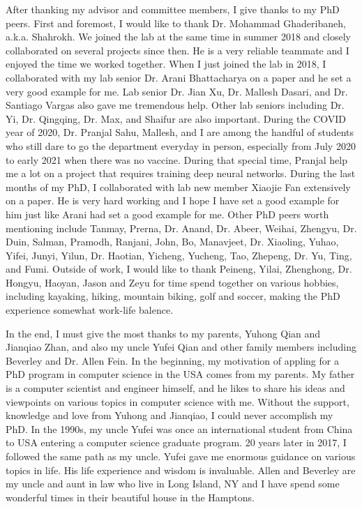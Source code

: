After thanking my advisor and committee members, I give thanks to my PhD peers. First and foremost, I would like to thank Dr. Mohammad Ghaderibaneh, a.k.a. Shahrokh.
We joined the lab at the same time in summer 2018 and closely collaborated on several projects since then. 
He is a very reliable teammate and I enjoyed the time we worked together.
When I just joined the lab in 2018, I collaborated with my lab senior Dr. Arani Bhattacharya on a paper and he set a very good example for me. 
Lab senior Dr. Jian Xu, Dr. Mallesh Dasari, and Dr. Santiago Vargas also gave me tremendous help. Other lab seniors including Dr. Yi, Dr. Qingqing, Dr. Max, and Shaifur are also important.
During the COVID year of 2020, Dr. Pranjal Sahu, Mallesh, and I are among the handful of students who still dare to go the department everyday in person, 
especially from July 2020 to early 2021 when there was no vaccine.
During that special time, Pranjal help me a lot on a project that requires training deep neural networks.
During the last months of my PhD, I collaborated with lab new member Xiaojie Fan extensively on a paper.
He is very hard working and I hope I have set a good example for him just like Arani had set a good example for me.
Other PhD peers worth mentioning include Tanmay, Prerna, Dr. Anand, Dr. Abeer, Weihai, Zhengyu, Dr. Duin, Salman, Pramodh, Ranjani, John, Bo, Manavjeet, Dr. Xiaoling, Yuhao, Yifei, Junyi, Yilun, Dr. Haotian, Yicheng, Yucheng, Tao, Zhepeng, Dr. Yu, Ting, and Fumi.
Outside of work, I would like to thank Peineng, Yilai, Zhenghong, Dr. Hongyu, Haoyan, Jason and Zeyu for time spend together on various hobbies, including kayaking, hiking, mountain biking, golf and soccer, making the PhD experience somewhat work-life balence.

In the end, I must give the most thanks to my parents, Yuhong Qian and Jianqiao Zhan, and also my uncle Yufei Qian 
and other family members including Beverley and Dr. Allen Fein.
In the beginning, my motivation of appling for a PhD program in computer science in the USA comes from my parents.
My father is a computer scientist and engineer himself, and he likes to share his ideas and viewpoints on various topics in computer science with me.
Without the support, knowledge and love from Yuhong and Jianqiao, I could never accomplish my PhD.
In the 1990s, my uncle Yufei was once an international student from China to USA entering a computer science graduate program.
20 years later in 2017, I followed the same path as my uncle. 
Yufei gave me enormous guidance on various topics in life. His life experience and wisdom is invaluable.
Allen and Beverley are my uncle and aunt in law who live in Long Island, NY and I have spend some wonderful times in their beautiful house in the Hamptons.
